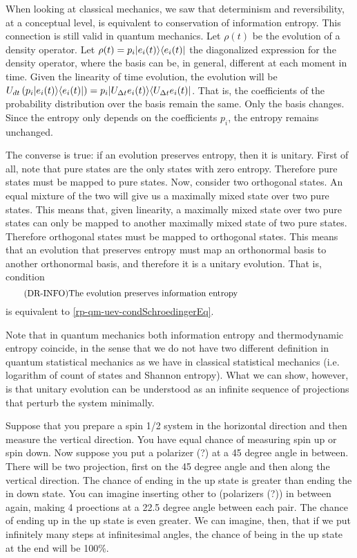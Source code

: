 When looking at classical mechanics, we saw that determinism and reversibility, at a conceptual level, is equivalent to conservation of information entropy. This connection is still valid in quantum mechanics. Let $\rho(t)$ be the evolution of a density operator. Let $\rho(t) = p_i |e_i(t) \rangle \langle e_i(t)|$ the diagonalized expression for the density operator, where the basis can be, in general, different at each moment in time. Given the linearity of time evolution, the evolution will be $U_{dt} \left( p_i |e_i(t) \rangle \langle e_i(t)| \right)= p_i |U_{\Delta t}e_i(t) \rangle \langle U_{\Delta t} e_i(t)|$. That is, the coefficients of the probability distribution over the basis remain the same. Only the basis changes. Since the entropy only depends on the coefficients $p_i$, the entropy remains unchanged.

The converse is true: if an evolution preserves entropy, then it is unitary. First of all, note that pure states are the only states with zero entropy. Therefore pure states must be mapped to pure states. Now, consider two orthogonal states. An equal mixture of the two will give us a maximally mixed state over two pure states. This means that, given linearity, a maximally mixed state over two pure states can only be mapped to another maximally mixed state of two pure states. Therefore orthogonal states must be mapped to orthogonal states. This means that an evolution that preserves entropy must map an orthonormal basis to another orthonormal basis, and therefore it is a unitary evolution. That is, condition
\begin{equation}\label{rp-qm-uev-condInfoEntropy}
	\tag{DR-INFO}
	\eqtext{The evolution preserves information entropy} 
\end{equation}
is equivalent to \ref{rp-qm-uev-condSchroedingerEq}.

Note that in quantum mechanics both information entropy and thermodynamic entropy coincide, in the sense that we do not have two different definition in quantum statistical mechanics as we have in classical statistical mechanics (i.e. logarithm of count of states and Shannon entropy). What we can show, however, is that unitary evolution can be understood as an infinite sequence of projections that perturb the system minimally.

Suppose that you prepare a spin 1/2 system in the horizontal direction and then measure the vertical direction. You have equal chance of measuring spin up or spin down. Now suppose you put a polarizer (?) at a 45 degree angle in between. There will be two projection, first on the 45 degree angle and then along the vertical direction. The chance of ending in the up state is greater than ending the in down state. You can imagine inserting other to (polarizers (?)) in between again, making 4 proections at a 22.5 degree angle between each pair. The chance of ending up in the up state is even greater. We can imagine, then, that if we put infinitely many steps at infinitesimal angles, the chance of being in the up state at the end will be 100\%.

